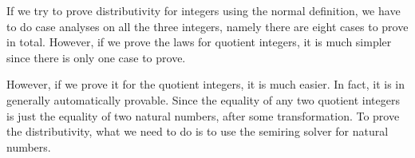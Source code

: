 
If we try to prove distributivity for integers using the normal
definition, we have to do case analyses on all the three integers,
namely there are eight cases to prove in total. However, if we prove
the laws for quotient integers, it is much simpler since there is
only one case to prove.



However, if we prove it for the quotient integers, it is much
easier. In fact, it is in generally automatically provable. Since the
equality of any two quotient integers is just the equality of two
natural numbers, after some transformation. 
To prove the distributivity, what we need to do is to use the semiring
solver for natural numbers. 


\begin{code}
\\
\> \AgdaSymbol{:} \<[9]%
\>[9]\AgdaFunction{\_*\_}  \AgdaFunction{\_+\_}\<%
\\
\> \AgdaSymbol{(} \AgdaInductiveConstructor{,} \AgdaSymbol{)} \AgdaSymbol{(} \AgdaInductiveConstructor{,} \AgdaSymbol{)} \AgdaSymbol{(} \AgdaInductiveConstructor{,} \AgdaSymbol{)} \AgdaSymbol{=}   \<[40]%
\>[40]\<%
\\
\>[0]\<[2]%
\>[2]         \AgdaFunction{:*} \AgdaSymbol{(} \AgdaFunction{:+} \AgdaSymbol{)} \AgdaFunction{:+}  \AgdaFunction{:*} \AgdaSymbol{(} \AgdaFunction{:+} \AgdaSymbol{)} \AgdaFunction{:+}\<%
\\
\>[2]\<[6]%
\>[6]\AgdaSymbol{(} \AgdaFunction{:*}  \AgdaFunction{:+}  \AgdaFunction{:*}  \AgdaFunction{:+} \AgdaSymbol{(} \AgdaFunction{:*}  \AgdaFunction{:+}  \AgdaFunction{:*} \AgdaSymbol{))}\<%
\\
\>[2]\<[6]%
\>[6]\AgdaFunction{:=}\<%
\\
\>[2]\<[6]%
\>[6] \AgdaFunction{:*}  \AgdaFunction{:+}  \AgdaFunction{:*}  \AgdaFunction{:+} \AgdaSymbol{(} \AgdaFunction{:*}  \AgdaFunction{:+}  \AgdaFunction{:*} \AgdaSymbol{)} \AgdaFunction{:+}\<%
\\
\>[2]\<[6]%
\>[6]\AgdaSymbol{(} \AgdaFunction{:*} \AgdaSymbol{(} \AgdaFunction{:+} \AgdaSymbol{)} \AgdaFunction{:+}  \AgdaFunction{:*} \AgdaSymbol{(} \AgdaFunction{:+} \AgdaSymbol{)))}       \<%
\\
\end{code}


